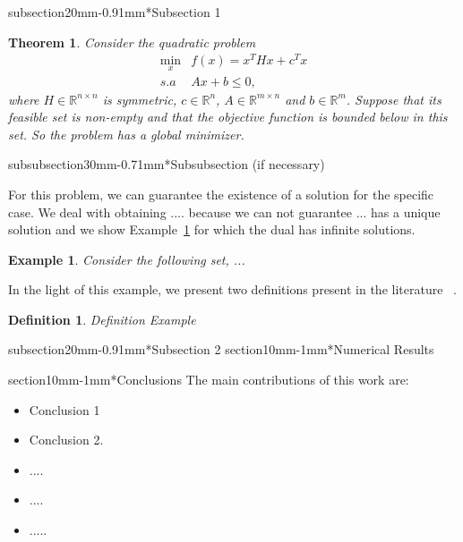 \documentclass[a0,portrait]{a0poster}
\makeatletter
\newtheorem{teo}{Theorem}
\newtheorem{exe}{Example}
\newtheorem{defi}{Definition}
\renewcommand{\Large}{\fontsize{45}{60}\selectfont\bfseries} %
\renewcommand{\LARGE}{\fontsize{50}{70}\selectfont\bfseries} %
\renewcommand{\large}{\fontsize{40}{50}\selectfont\bfseries}
\renewcommand{\section}{\@startsection%
  {section}{1}{0mm}{-\baselineskip}{1mm}{\LARGE\color{myred}\bfseries}}
\renewcommand{\subsection}{\@startsection%
  {subsection}{2}{0mm}{-0.9\baselineskip}{1mm}{\Large\color{myred}\bfseries}}
\renewcommand{\subsubsection}{\@startsection%
  {subsubsection}{3}{0mm}{-0.7\baselineskip}{1mm}{\large\color{myred}\bfseries}}
\makeatother
\begin{document}
\begin{multicols}{2}
\subsection*{Subsection 1}

\begin{teo}\label{teorema1}
	Consider the quadratic problem
	\begin{equation}
	\label{prob_quad}
	\begin{array}{cl}
	\displaystyle\min_x & f(x)=x^THx+c^Tx\\
	s.a & Ax+b\leq 0,
	\end{array}
	\end{equation}
	where $H\in\mathbb{R}^{n\times n}$ is symmetric, $c\in\mathbb{R}^n$, $A\in\mathbb{R}^{m\times n}$ 
	and $b\in\mathbb{R}^m$. Suppose that its feasible set
	is non-empty and that the objective function is bounded below in this set. So
	the problem has a global minimizer.
\end{teo}


\subsubsection*{Subsubsection (if necessary)}

For this problem, we can guarantee the existence of a solution for the specific case. We deal with obtaining .... because we can not guarantee ... has a unique solution and we show Example~\ref{analisevs} for which the dual has infinite solutions.
\begin{exe}
	\label{analisevs}
	Consider the following set, 
	... 
\end{exe}


In the light of this example, we present two definitions present in the literature ~\cite{Reference1, Reference2}.
\begin{defi}
	\label{def_vs1}
	Definition Example
\end{defi} 

\subsection*{Subsection 2}
\section*{Numerical Results}



\textcolor{myblue}{
\section*{\textcolor{myblue}{Conclusions}}
The main contributions of this work are:
\begin{itemize}
	\item Conclusion 1
	\item Conclusion 2.
	\item ....
	\item ....
	\item .....		
\end{itemize}
}	

\end{multicols}
\end{document}
